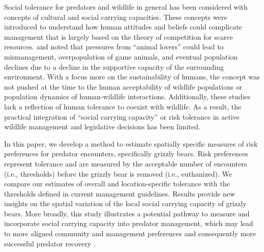 \documentclass[english,12pt]{article}
\begin{document}

Social tolerance for predators and wildlife in general has been considered with concepts of cultural and social carrying capacities. These concepts were introduced to understand how human attitudes and beliefs could complicate management that is largely based on the theory of competition for scarce resources. \cite{hardin1992cultural} and \cite{seidl1999carrying} noted that pressures from ``animal lovers'' could lead to mismanagement, overpopulation of game animals, and eventual population declines due to a decline in the supportive capacity of the surrounding environment. With a focus more on the sustainability of humans, the concept was not pushed at the time to the human acceptability of wildlife populations or population dynamics of human-wildlife interactions. Additionally, these studies lack a reflection of human tolerance to coexist with wildlife. As a result, the practical integration of ``social carrying capacity'' or risk tolerance in active wildlife management and legislative decisions has been limited.

In this paper, we develop a method to estimate spatially specific measures of risk preferences for predator encounters, specifically grizzly bears. Risk preferences represent tolerance and are measured by the acceptable number of encounters (i.e., thresholds) before the grizzly bear is removed (i.e., euthanized). We compare our estimates of overall and location-specific tolerance with the thresholds defined in current management guidelines. Results provide new insights on the spatial variation of the local social carrying capacity of grizzly bears. More broadly, this study illustrates a potential pathway to measure and incorporate social carrying capacity into predator management, which may lead to more aligned community and management preferences and consequently more successful predator recovery \citep{slagle2017attitudes}. 
\end{document}

